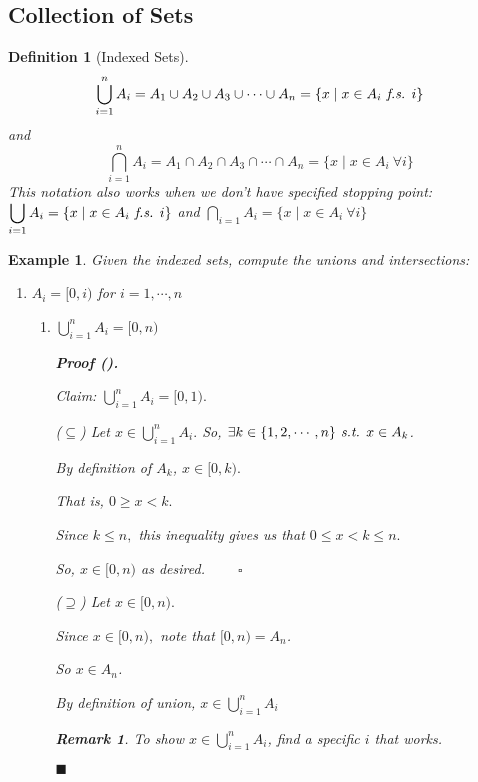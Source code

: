 \documentclass[12pt,a4paper]{article}
\newtheorem{df}{Definition}[subsection]
\newtheorem{eg}{Example}[subsection]
\newcounter{nprf}[subsection]
\newtheorem*{rmk}{\indent Remark}
\newenvironment*{prf}{\par\indent\textbf{\textit{Proof} (\stepcounter{nprf}\thenprf). }\par}{\par\hfill $\blacksquare$\par}
\def\st{\emph{ s.t. }}
\def\fs{\emph{ f.s. }}
\begin{document}
\subsection{Collection of Sets}
\begin{df}[Indexed Sets]
	\[\bigcup_{i=1}^nA_i=A_1\cup A_2\cup A_3\cup\cdots\cup A_n=\{x\mid x\in A_i \fs i\}\] and \[\bigcap_{i=1}^nA_i=A_1\cap A_2\cap A_3\cap\cdots\cap A_n=\{x\mid x\in A_i\ \forall i\}\] This notation also works when we don't have specified stopping point: $\displaystyle\bigcup_{i=1}A_i=\{x\mid x\in A_i\fs i\}$ and $\displaystyle \bigcap_{i=1}A_i=\{x\mid x\in A_i\ \forall i\}$
\end{df}
\begin{eg}
	Given the indexed sets, compute the unions and intersections:
	\begin{enumerate}
		\item $A_i=[0,i)$ for $i=1,\cdots,n$
		\begin{enumerate}
			\item $\displaystyle\bigcup_{i=1}^n A_i=[0,n)$
			\begin{prf}
			Claim: $\displaystyle\bigcup_{i=1}^n A_i=[0,1).$\par($\subseteq$) Let $\displaystyle x\in\bigcup_{i=1}^n A_i.$ So, $\exists k\in\qty{1, 2,\cdots,n}\st x\in A_k$.\par\hspace{5mm}By definition of $A_k$, $x\in[0,k).$\par\hspace{5mm}That is, $0\geq x<k.$\par\hspace{5mm}Since $k\leq n,$ this inequality gives us that $0\leq x<k\leq n.$\par\hspace{5mm}So, $x\in[0,n)$ as desired. $\qquad\square$\par($\supseteq$) Let $x\in[0,n).$\par\hspace{5mm}Since $x\in[0,n),$ note that $[0,n)=A_n$.\par\hspace{5mm}So $x\in A_n$.\par\hspace{5mm}By definition of union, $x\in\displaystyle\bigcup_{i=1}^n A_i$
			\begin{rmk} To show $\displaystyle x\in\bigcup_{i=1}^n A_i$, find a specific $i$ that works. \end{rmk}	
			\end{prf}

\end{enumerate}
\end{enumerate}
\end{eg}
\end{document}
